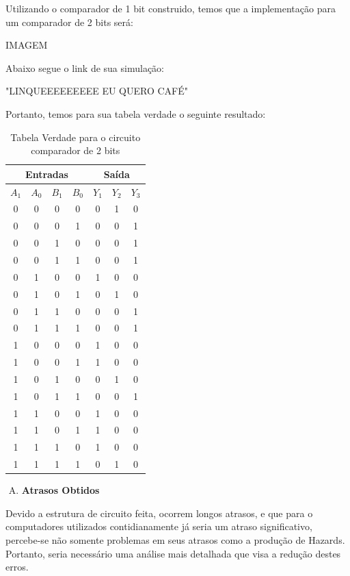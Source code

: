 \documentclass[12pt]{article}
\begin{document}
Utilizando o comparador de 1 bit construido, temos que a implementação para um comparador de 2 bits será:

IMAGEM

Abaixo segue o link de sua simulação:

"LINQUEEEEEEEEE EU QUERO CAFÉ"

Portanto, temos para sua tabela verdade o seguinte resultado:
\begin{table}[H]
    \centering
    \caption{Tabela Verdade para o circuito comparador de 2 bits}
    \begin{tabular}{|c|c|c|c|c|c|c|}\hline
    \multicolumn{4}{|c|}{Entradas} & \multicolumn{3}{|c|}{Saída} \\\hline
    \textbf{$A_{1}$} & \textbf{$A_{0}$} & \textbf{$B_{1}$} & \textbf{$B_{0}$} & \textbf{$Y_{1}$} & \textbf{$Y_{2}$} & \textbf{$Y_{3}$} \\\hline
    0 & 0 & 0 & 0 & 0 & 1 & 0\\\hline
    0 & 0 & 0 & 1 & 0 & 0 & 1\\\hline
    0 & 0 & 1 & 0 & 0 & 0 & 1\\\hline
    0 & 0 & 1 & 1 & 0 & 0 & 1\\\hline
    0 & 1 & 0 & 0 & 1 & 0 & 0\\\hline
    0 & 1 & 0 & 1 & 0 & 1 & 0\\\hline
    0 & 1 & 1 & 0 & 0 & 0 & 1\\\hline
    0 & 1 & 1 & 1 & 0 & 0 & 1\\\hline
    1 & 0 & 0 & 0 & 1 & 0 & 0\\\hline
    1 & 0 & 0 & 1 & 1 & 0 & 0\\\hline
    1 & 0 & 1 & 0 & 0 & 1 & 0\\\hline
    1 & 0 & 1 & 1 & 0 & 0 & 1\\\hline
    1 & 1 & 0 & 0 & 1 & 0 & 0\\\hline
    1 & 1 & 0 & 1 & 1 & 0 & 0\\\hline
    1 & 1 & 1 & 0 & 1 & 0 & 0\\\hline
    1 & 1 & 1 & 1 & 0 & 1 & 0\\\hline
    \end{tabular}\label{tab:comparador_de_palavras_3_bits}
\end{table}

\begin{enumerate}[D)]
\item \textbf{Atrasos Obtidos}
\end{enumerate}
Devido a estrutura de circuito feita, ocorrem longos atrasos, e que para o computadores utilizados contidianamente já seria um atraso significativo, percebe-se não somente problemas em seus atrasos como a produção de Hazards. Portanto, seria necessário uma análise mais detalhada que visa a redução destes erros.
\end{document}

